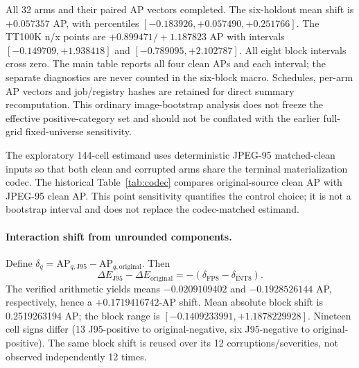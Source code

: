 \documentclass[10pt]{article}
\newcommand{\AP}{\mathrm{AP}}
\newcommand{\Jclean}{\mathrm{J95}}
\begin{document}
All 32 arms and their paired AP vectors completed. The six-holdout mean
shift is $+0.057357$ AP, with percentiles $[-0.183926,+0.057490,+0.251766]$.
The TT100K n/x points are $+0.899471/+1.187823$ AP with intervals
$[-0.149709,+1.938418]$ and $[-0.789095,+2.102787]$. All eight block intervals
cross zero. The main table reports all four clean APs and each interval;
the separate diagnostics are never counted in the six-block macro. Schedules,
per-arm AP vectors and job/registry hashes are retained for direct summary
recomputation. This ordinary image-bootstrap analysis does not freeze the
effective positive-category set and should not be conflated with the earlier
full-grid fixed-universe sensitivity.

The exploratory 144-cell estimand uses deterministic JPEG-95 matched-clean inputs so that
both clean and corrupted arms share the terminal materialization codec.
The historical Table~\ref{tab:codec} compares original-source clean AP with JPEG-95 clean AP.
This point sensitivity quantifies the control choice; it is not a bootstrap
interval and does not replace the codec-matched estimand.

\begin{table}[htbp]
\centering
\caption{Original-source clean versus deterministic JPEG-95 clean AP. The last
column is JPEG-95 minus original-source AP, all on the 0--100 AP-point scale.}
\label{tab:codec}
\scriptsize
\resizebox{\textwidth}{!}{}
\end{table}

\FloatBarrier


\paragraph{Interaction shift from unrounded components.}
Define $\delta_q=\AP_{q,\Jclean}-\AP_{q,\mathrm{original}}$. Then
\begin{equation}
\Delta E_{\Jclean}-\Delta E_{\mathrm{original}}=-(\delta_{\mathrm{FP8}}-\delta_{\mathrm{INT8}}).
\end{equation}
The verified arithmetic yields means $-0.0209109402$ and $-0.1928526144$ AP, respectively, hence a $+0.1719416742$-AP shift. Mean absolute block shift is 0.2519263194 AP; the block range is $[-0.1409233991,+1.1878229928]$. Nineteen cell signs differ (13 J95-positive to original-negative, six J95-negative to original-positive). The same block shift is reused over its 12 corruptions/severities, not observed independently 12 times.
\end{document}
